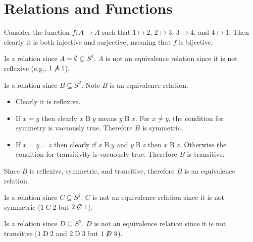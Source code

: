 \section{Relations and Functions}
\begin{questions}
    \item Consider the function $f: A \to A$ such that $1 \mapsto 2$, $2 \mapsto 3$, $3 \mapsto 4$, and $4 \mapsto 1$. Then clearly it is both injective and surjective, meaning that $f$ is bijective.

    \item \begin{partquestions}{\alph*}
        \item Is a relation since $A = \emptyset \subseteq S^2$. $A$ is not an equivalence relation since it is not reflexive (e.g., $1\not\mathrel{A}1$).

        \item Is a relation since $B \subseteq S^2$. Note $B$ is an equivalence relation.
        \begin{itemize}
            \item Clearly it is reflexive.
            \item If $x = y$ then clearly $x\mathrel{B}y$ means $y\mathrel{B}x$. For $x \neq y$, the condition for symmetry is vacuously true. Therefore $B$ is symmetric.
            \item If $x = y = z$ then clearly if $x\mathrel{B}y$ and $y\mathrel{B}z$ then $x\mathrel{B}z$. Otherwise the condition for transitivity is vacuously true. Therefore $B$ is transitive.
        \end{itemize}
        Since $B$ is reflexive, symmetric, and transitive, therefore $B$ is an equivalence relation.

        \item Is a relation since $C \subseteq S^2$. $C$ is not an equivalence relation since it is not symmetric ($1\mathrel{C}2$ but $2\not\mathrel{C}1$).

        \item Is a relation since $D \subseteq S^2$. $D$ is not an equivalence relation since it is not transitive ($1\mathrel{D}2$ and $2\mathrel{D}3$ but $1\not\mathrel{D}3$).
    \end{partquestions}


\end{questions}
